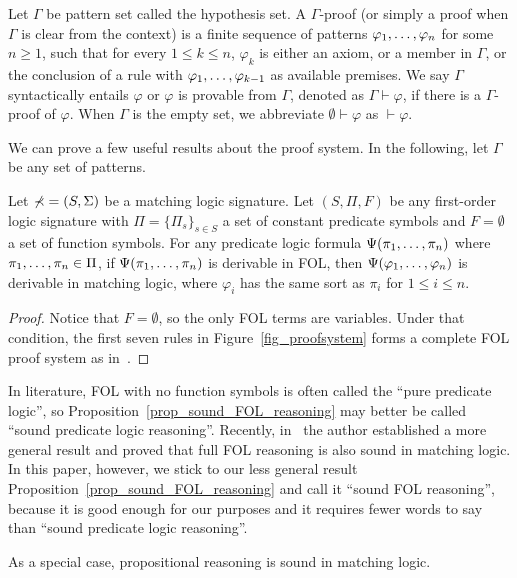 \documentclass{amsart}
\begin{document}
\begin{definition}
\label{def_proof}
Let $\Gamma$ be pattern set called the hypothesis set.
A $\Gamma$-proof (or simply a proof when $\Gamma$ is clear from the context)
is a finite sequence of patterns
$\varphi_1 ,\dots, \varphi_n$ for some $n \ge 1$, such that
for every $1 \le k \le n$,
$\varphi_k$ is either an axiom,
or a member in $\Gamma$,
or the conclusion of a rule
with $\varphi_1 ,\dots, \varphi_{k-1}$ as available premises.
We say $\Gamma$ syntactically entails $\varphi$ or 
$\varphi$ is provable from $\Gamma$,
denoted as $\Gamma \vdash \varphi$,
if there is a $\Gamma$-proof of $\varphi$.
When $\Gamma$ is the empty set,
we abbreviate $\emptyset \vdash \varphi$
as $\vdash \varphi$.
\end{definition}

We can prove a few useful results about the proof system.
In the following, let $\Gamma$ be any set of patterns.

\begin{proposition}
\label{prop_sound_FOL_reasoning}
Let $\mathbb{\Sigma} = (S, \Sigma)$ be a matching logic signature.
Let $(S,\Pi,F)$ be any first-order logic signature
with $\Pi = \{ \Pi_s \}_{s \in S}$ a set of constant predicate symbols
and $F = \emptyset$ a set of function symbols.
For any predicate logic formula
$\Psi(\pi_1 ,\dots, \pi_n)$ where
$\pi_1 ,\dots, \pi_n \in \Pi$,
if $\Psi(\pi_1 ,\dots, \pi_n)$ is derivable in FOL,
then $\Psi(\varphi_1 ,\dots, \varphi_n)$ is derivable in matching logic,
where $\varphi_i$ has the same sort as $\pi_i$ for $1 \le i \le n$.
\end{proposition}
\begin{proof}
Notice that $F = \emptyset$, so the only FOL terms are variables.
Under that condition, the first seven rules in Figure~\ref{fig_proofsystem}
forms a complete FOL proof system as in~\cite{hamilton1988logic}.
\end{proof}

\begin{remark}
In literature, FOL with no function symbols is often called 
the ``pure predicate logic'',
so Proposition~\ref{prop_sound_FOL_reasoning} may better be called
``sound predicate logic reasoning''.
Recently, in~\cite{rosu-2017-lmcs} the author established a more general result
and proved that full FOL reasoning is also sound in matching logic.
In this paper, however, we stick to
our less general result Proposition~\ref{prop_sound_FOL_reasoning}
and call it ``sound FOL reasoning'', 
because it is good enough for our purposes
and it requires fewer words to say
than ``sound predicate logic reasoning''.
\end{remark}
\begin{remark}
As a special case, propositional reasoning is sound in matching logic.
\end{remark}
\end{document}
